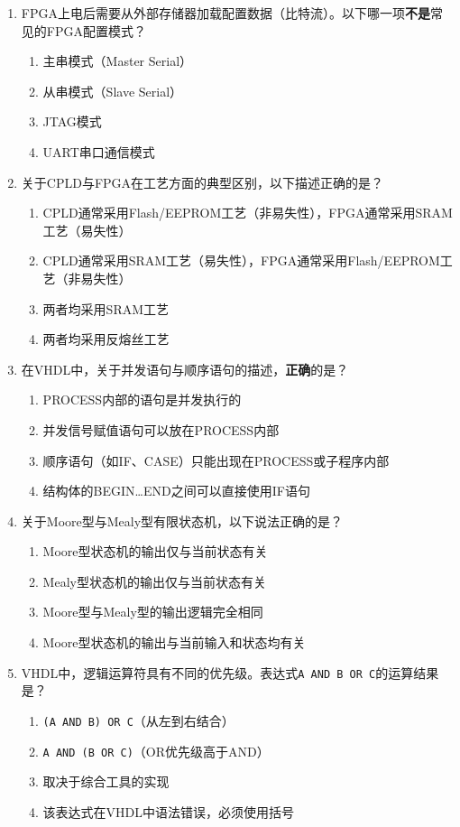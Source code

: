 \begin{enumerate}[label=\arabic*.]

\item FPGA上电后需要从外部存储器加载配置数据（比特流）。以下哪一项\textbf{不是}常见的FPGA配置模式？
\begin{enumerate}[label=\Alph*.]
  \item 主串模式（Master Serial）
  \item 从串模式（Slave Serial）
  \item JTAG模式
  \item UART串口通信模式
\end{enumerate}

\item 关于CPLD与FPGA在工艺方面的典型区别，以下描述正确的是？
\begin{enumerate}[label=\Alph*.]
  \item CPLD通常采用Flash/EEPROM工艺（非易失性），FPGA通常采用SRAM工艺（易失性）
  \item CPLD通常采用SRAM工艺（易失性），FPGA通常采用Flash/EEPROM工艺（非易失性）
  \item 两者均采用SRAM工艺
  \item 两者均采用反熔丝工艺
\end{enumerate}

\item 在VHDL中，关于并发语句与顺序语句的描述，\textbf{正确}的是？
\begin{enumerate}[label=\Alph*.]
  \item PROCESS内部的语句是并发执行的
  \item 并发信号赋值语句可以放在PROCESS内部
  \item 顺序语句（如IF、CASE）只能出现在PROCESS或子程序内部
  \item 结构体的BEGIN\ldots END之间可以直接使用IF语句
\end{enumerate}

\item 关于Moore型与Mealy型有限状态机，以下说法正确的是？
\begin{enumerate}[label=\Alph*.]
  \item Moore型状态机的输出仅与当前状态有关
  \item Mealy型状态机的输出仅与当前状态有关
  \item Moore型与Mealy型的输出逻辑完全相同
  \item Moore型状态机的输出与当前输入和状态均有关
\end{enumerate}

\item VHDL中，逻辑运算符具有不同的优先级。表达式\verb|A AND B OR C|的运算结果是？
\begin{enumerate}[label=\Alph*.]
  \item \verb|(A AND B) OR C|（从左到右结合）
  \item \verb|A AND (B OR C)|（OR优先级高于AND）
  \item 取决于综合工具的实现
  \item 该表达式在VHDL中语法错误，必须使用括号
\end{enumerate}


\end{enumerate}
